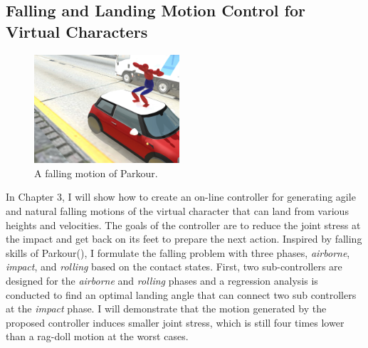 \subsection{Falling and Landing Motion Control for Virtual Characters}
\begin{figure}
 \vspace{-25pt}
  \begin{center}
    \includegraphics[width=0.48\textwidth]{images/intro_landing.jpg}
  \end{center}
   \vspace{-25pt}
  \caption{A falling motion of Parkour.}
  \label{fig:intro_landing}
   \vspace{-10pt}
\end{figure}
In Chapter 3, I will show how to create an on-line controller for generating 
agile and natural falling motions of the virtual character that can land from 
various heights and velocities.
The goals of the controller are to reduce the joint stress at the impact and
get back on its feet to prepare the next action.
Inspired by falling skills of Parkour(), I formulate the falling problem
with three phases, \emph{airborne}, \emph{impact}, and \emph{rolling}
based on the contact states.
First, two sub-controllers are designed for the \emph{airborne} and
\emph{rolling} phases and a regression analysis is conducted to find 
an optimal landing angle that can connect two sub controllers at the
\emph{impact} phase.
I will demonstrate that the motion generated by the proposed controller
induces smaller joint stress, which is still four times lower than a rag-doll
motion at the worst cases.

